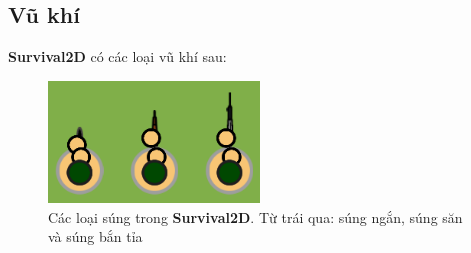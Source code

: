 \documentclass[12pt,a4paper]{article}
\begin{document}
  \subsection{Vũ khí}
  \textbf{Survival2D} có các loại vũ khí sau:
  \begin{figure}[H]
      \centering
      \includegraphics[width=0.5\textwidth]{Img/game_screen_shoot/player_gun.png}
      \caption{Các loại súng trong \textbf{Survival2D}. Từ trái qua: súng ngắn, súng săn và súng bắn tỉa}
  \end{figure}
\end{document}
